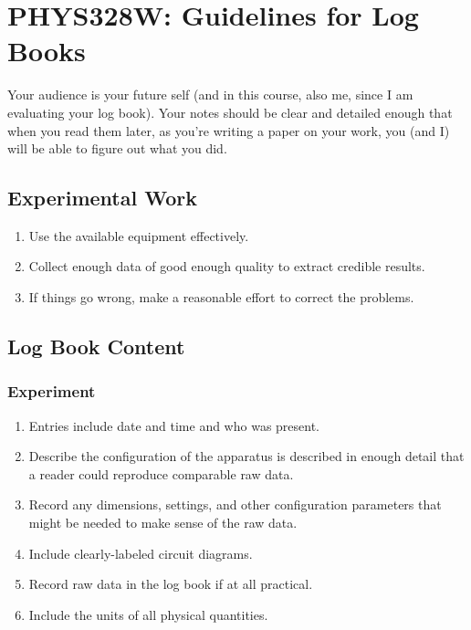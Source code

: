 \documentclass[11 pt]{article}
\begin{document}
\section*{PHYS328W: Guidelines for Log Books}

Your audience is your future self (and in this course, also me, since
I am evaluating your log book). Your notes should be clear and detailed
enough that when you read them later, as you're writing a
paper on your work, you (and I) will be able to figure out what you
did.

\subsection*{Experimental Work}
\begin{enumerate}
  \item Use the available equipment effectively.

  \item Collect enough data of good enough quality to extract credible
    results.

  \item If things go wrong, make a reasonable effort to correct
    the problems.
\end{enumerate}
  
\subsection*{Log Book Content}
\subsubsection*{Experiment}
\begin{enumerate}
\item Entries include date and time and who was present.

\item Describe the configuration of the apparatus is described in enough 
  detail that a reader could reproduce comparable raw data.

\item Record any dimensions, settings, and other configuration
  parameters that might be needed to make sense of the raw data.

\item Include clearly-labeled circuit diagrams.

\item Record raw data in the log book if at all practical.

\item Include the units of all physical quantities.
\end{enumerate}
\end{document}
